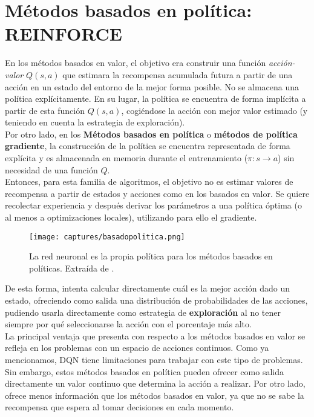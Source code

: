 \documentclass[11pt,fleqn]{book} %
\begin{document}
\section{Métodos basados en política: REINFORCE}

En los métodos basados en valor, el objetivo era construir una función \textit{acción-valor} $Q(s,a)$ que estimara la recompensa acumulada futura a partir de una acción en un estado del entorno de la mejor forma posible. No se almacena una política explícitamente. En su lugar, la política se encuentra de forma implícita a partir de esta función $Q(s,a)$, cogiéndose la acción con mejor valor estimado (y teniendo en cuenta la estrategia de exploración). \\

Por otro lado, en los \textbf{Métodos basados en política} o \textbf{métodos de política gradiente}, la construcción de la política se encuentra representada de forma explícita y es almacenada en memoria durante el entrenamiento ($\pi: s \rightarrow a$) sin necesidad de una función $Q$. \\

Entonces, para esta familia de algoritmos, el objetivo no es estimar valores de recompensa a partir de estados y acciones como en los basados en valor. Se quiere recolectar experiencia y después derivar los parámetros a una política óptima (o al menos a optimizaciones locales), utilizando para ello el gradiente.

\begin{figure}[H]
	\centering\texttt{[image: captures/basadopolitica.png]}
	\caption{La red neuronal es la propia política para los métodos basados en políticas. Extraída de \cite{article:RLromero}.}
	\label{fig:reinforce} %
\end{figure}

De esta forma, intenta calcular directamente cuál es la mejor acción dado un estado, ofreciendo como salida una distribución de probabilidades de las acciones, pudiendo usarla directamente como estrategia de \textbf{exploración} al no tener siempre por qué seleccionarse la acción con el porcentaje más alto. \\

La principal ventaja que presenta con respecto a los métodos basados en valor se refleja en los problemas con un espacio de acciones continuos. Como ya mencionamos, DQN tiene limitaciones para trabajar con este tipo de problemas. Sin embargo, estos métodos basados en política pueden ofrecer como salida directamente un valor continuo que determina la acción a realizar. Por otro lado, ofrece menos información que los métodos basados en valor, ya que no se sabe la recompensa que espera al tomar decisiones en cada momento.\\
\end{document}
